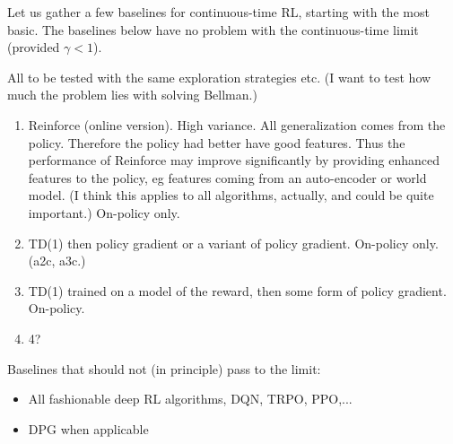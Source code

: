 \documentclass[11pt,a4paper]{article}
\begin{document}
Let us gather a few baselines for continuous-time RL, starting with the
most basic. The baselines below have no problem with the continuous-time
limit (provided $\gamma<1$).

All to be tested with the same exploration strategies etc. (I want to
test how much the problem lies with solving Bellman.)

\begin{enumerate}

\item Reinforce (online version). High variance. All generalization comes
from the policy. Therefore the policy had better have good features. Thus
the performance of Reinforce may improve significantly by providing
enhanced features to the policy, eg features coming from an auto-encoder
or world model. (I think this applies to all algorithms, actually, and
could be quite important.) On-policy only.

\item TD(1) then policy gradient or a variant of policy gradient.
On-policy only. (a2c, a3c.)

\item TD(1) trained on a model of the reward, then some form of policy
gradient. On-policy.

\item 4?
\end{enumerate}

Baselines that should not (in principle) pass to the limit:
\begin{itemize}
\item All fashionable deep RL algorithms, DQN, TRPO, PPO,...
\item DPG when applicable
\end{itemize}
\end{document}
